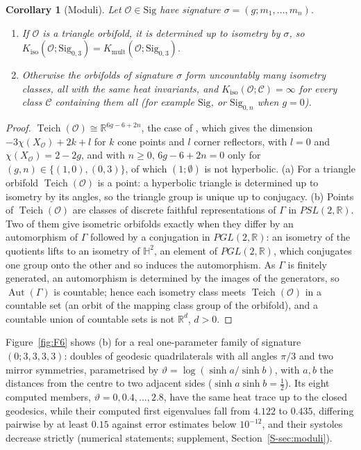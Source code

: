 \documentclass[pdflatex,sn-mathphys-num]{sn-jnl}
\theoremstyle{thmstyleone}%
\newtheorem{corollary}[theorem]{Corollary}%
\theoremstyle{thmstylethree}%
\newcommand{\Orb}{\mathcal{O}}
\newcommand{\Cl}{\mathcal{C}}
\newcommand{\Sig}{\mathrm{Sig}}
\newcommand{\Kiso}{K_{\mathrm{iso}}}
\newcommand{\Kmult}{K_{\mathrm{mult}}}
\newcommand{\Teich}{\operatorname{Teich}}
\newcommand{\R}{\mathbb{R}}
\newcommand{\sref}[1]{\ref*{S-#1}}%
\begin{document}
\begin{corollary}[Moduli]\label{cor:Kinf}\label{prop:rigidity}
Let $\Orb\in\Sig$ have signature $\sigma=(g;m_1,\dots,m_n)$.
\begin{enumerate}[label=(\alph*)]
\item If $\Orb$ is a triangle orbifold, it is determined up to isometry by $\sigma$, so $\Kiso(\Orb;\Sig_{0,3})=\Kmult(\Orb;\Sig_{0,3})$.
\item Otherwise the orbifolds of signature $\sigma$ form uncountably many isometry classes, all with the same heat invariants, and $\Kiso(\Orb;\Cl)=\infty$ for every class $\Cl$ containing them all (for example $\Sig$, or $\Sig_{0,n}$ when $g=0$).
\end{enumerate}
\end{corollary}

\begin{proof}
$\Teich(\Orb)\cong\R^{6g-6+2n}$, the case of \cite[Cor.~13.3.7]{thurston1980}, which gives the dimension $-3\chi(X_\Orb)+2k+l$ for $k$ cone points and $l$ corner reflectors, with $l=0$ and $\chi(X_\Orb)=2-2g$, and with $n\ge0$, $6g-6+2n=0$ only for $(g,n)\in\{(1,0),(0,3)\}$, of which $(1;\emptyset)$ is not hyperbolic. (a) For a triangle orbifold $\Teich(\Orb)$ is a point: a hyperbolic triangle is determined up to isometry by its angles, so the triangle group is unique up to conjugacy. (b) Points of $\Teich(\Orb)$ are classes of discrete faithful representations of $\Gamma$ in $PSL(2,\R)$. Two of them give isometric orbifolds exactly when they differ by an automorphism of $\Gamma$ followed by a conjugation in $PGL(2,\R)$: an isometry of the quotients lifts to an isometry of $\mathbb H^2$, an element of $PGL(2,\R)$, which conjugates one group onto the other and so induces the automorphism. As $\Gamma$ is finitely generated, an automorphism is determined by the images of the generators, so $\operatorname{Aut}(\Gamma)$ is countable; hence each isometry class meets $\Teich(\Orb)$ in a countable set (an orbit of the mapping class group of the orbifold), and a countable union of countable sets is not $\R^d$, $d>0$.
\end{proof}

Figure~\ref{fig:F6} shows (b) for a real one-parameter family of signature $(0;3,3,3,3)$: doubles of geodesic quadrilaterals with all angles $\pi/3$ and two mirror symmetries, parametrised by $\vartheta=\log(\sinh a/\sinh b)$, with $a,b$ the distances from the centre to two adjacent sides ($\sinh a\sinh b=\frac12$). Its eight computed members, $\vartheta=0,0.4,\dots,2.8$, have the same heat trace up to the closed geodesics, while their computed first eigenvalues fall from $4.122$ to $0.435$, differing pairwise by at least $0.15$ against error estimates below $10^{-12}$, and their systoles decrease strictly (numerical statements; supplement, Section~\sref{sec:moduli}).
\end{document}
